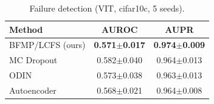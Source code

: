 \begin{table}[ht]
\centering
\caption{Failure detection (VIT, cifar10c, 5 seeds).}
\label{tab:main}
\begin{tabular}{lcc}
\toprule
Method & AUROC & AUPR \\
\midrule
BFMP/LCFS (ours) & \textbf{0.571$\pm$0.017} & \textbf{0.974$\pm$0.009} \\
MC Dropout & 0.582$\pm$0.040 & 0.964$\pm$0.013 \\
ODIN & 0.573$\pm$0.038 & 0.963$\pm$0.013 \\
Autoencoder & 0.568$\pm$0.021 & 0.964$\pm$0.008 \\
\bottomrule
\end{tabular}
\end{table}